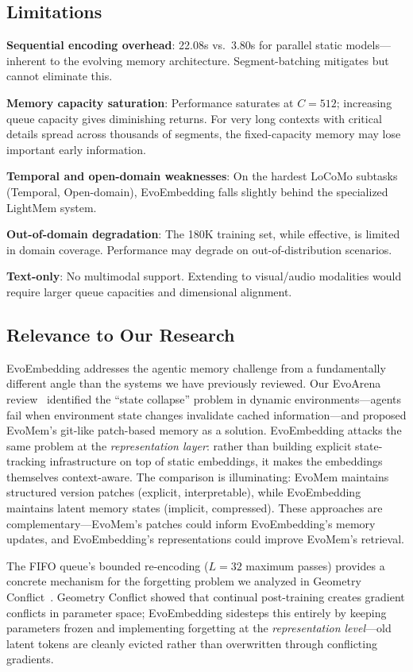 \documentclass[11pt,a4paper]{article}
\begin{document}
\subsection{Limitations}

\textbf{Sequential encoding overhead}: 22.08s vs.\ 3.80s for parallel static models---inherent to the evolving memory architecture. Segment-batching mitigates but cannot eliminate this.

\textbf{Memory capacity saturation}: Performance saturates at $C=512$; increasing queue capacity gives diminishing returns. For very long contexts with critical details spread across thousands of segments, the fixed-capacity memory may lose important early information.

\textbf{Temporal and open-domain weaknesses}: On the hardest LoCoMo subtasks (Temporal, Open-domain), EvoEmbedding falls slightly behind the specialized LightMem system.

\textbf{Out-of-domain degradation}: The 180K training set, while effective, is limited in domain coverage. Performance may degrade on out-of-distribution scenarios.

\textbf{Text-only}: No multimodal support. Extending to visual/audio modalities would require larger queue capacities and dimensional alignment.

\subsection{Relevance to Our Research}

EvoEmbedding addresses the agentic memory challenge from a fundamentally different angle than the systems we have previously reviewed. Our EvoArena review~\cite{xu2026evoarena} identified the ``state collapse'' problem in dynamic environments---agents fail when environment state changes invalidate cached information---and proposed EvoMem's git-like patch-based memory as a solution. EvoEmbedding attacks the same problem at the \emph{representation layer}: rather than building explicit state-tracking infrastructure on top of static embeddings, it makes the embeddings themselves context-aware. The comparison is illuminating: EvoMem maintains structured version patches (explicit, interpretable), while EvoEmbedding maintains latent memory states (implicit, compressed). These approaches are complementary---EvoMem's patches could inform EvoEmbedding's memory updates, and EvoEmbedding's representations could improve EvoMem's retrieval.

The FIFO queue's bounded re-encoding ($L=32$ maximum passes) provides a concrete mechanism for the forgetting problem we analyzed in Geometry Conflict~\cite{wu2026geometry}. Geometry Conflict showed that continual post-training creates gradient conflicts in parameter space; EvoEmbedding sidesteps this entirely by keeping parameters frozen and implementing forgetting at the \emph{representation level}---old latent tokens are cleanly evicted rather than overwritten through conflicting gradients.
\end{document}
